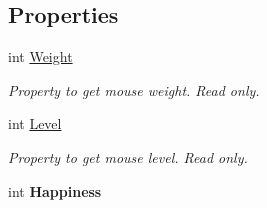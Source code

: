 \subsection*{Properties}
\begin{DoxyCompactItemize}
\item 
int \hyperlink{class_mouse_add4f90aa1a1e81b981a6b2dfdb0c9e24}{Weight}
\begin{DoxyCompactList}\small\item\em Property to get mouse weight. Read only. \end{DoxyCompactList}\item 
int \hyperlink{class_mouse_a76debda38af30b4b2249757bc316f66e}{Level}
\begin{DoxyCompactList}\small\item\em Property to get mouse level. Read only. \end{DoxyCompactList}\item 
int {\bfseries Happiness}\hypertarget{class_mouse_a91cb125845991ce20246753f7eef2b8e}{}\label{class_mouse_a91cb125845991ce20246753f7eef2b8e}


\end{DoxyCompactItemize}
